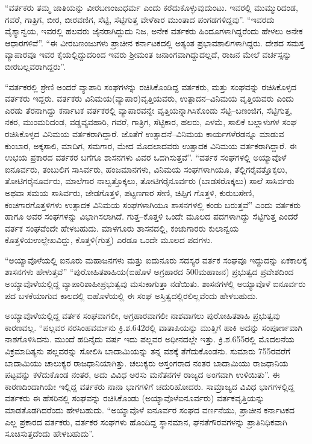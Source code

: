 “ವರ್ತಕರು ತಮ್ಮ ಜಾತಿಯನ್ನು ವೀರಬಣಂಜುಧರ್ಮ ಎಂದು ಕರೆದುಕೊಳ್ಳುವುದುಂಟು. ಇವರಲ್ಲಿ ಮುಮ್ಮುರಿದಂಡ, ಗವರೆ, ಗಾತ್ರಿಗ, ಬೀರ, ಬೀರವಣಿಗ, ಸೆಟ್ಟಿ, ಸೆಟ್ಟಿಗುತ್ತ ವೇಳೆಕಾರ ಮುಂತಾದ ಪಂಗಡಗಳಿದ್ದವು”. “ಇವರದು ವೈಶ್ಯಾನ್ವಯ, ಇವರಲ್ಲಿ ಹಲವರು ಜೈನರಾಗಿದ್ದುದು ನಿಜ, ಅನೇಕ ವರ್ತಕರು ಹಿಂದೂಗಳಾಗಿದ್ದರೆಂದು ಹೇಳಲು ಅನೇಕ ಆಧಾರಗಳಿವೆ”. “ಈ ವೀರಬಣಂಜುಗಳು ಪ್ರಾಚೀನ ಕರ್ನಾಟಕದಲ್ಲಿ ಅತ್ಯಂತ ಪ್ರಭಾವಶಾಲಿಗಳಾಗಿದ್ದರು. ದೇಶದ ಸಮಸ್ತ ವ್ಯಾಪಾರವೂ ಇವರ ಕೈಯಲ್ಲಿದ್ದುದರಿಂದ ಇವರು ಶ‍್ರೀಮಂತ ಜನಾಂಗವಾಗಿದ್ದುದಲ್ಲದೆ, ರಾಜನ ಮೇಲೆ ವರ್ಚಸ್ಸನ್ನು ಬೀರಬಲ್ಲವರಾಗಿದ್ದರು”.

“ವರ್ತಕರಲ್ಲಿ ಶ್ರೇಣಿ ಅಂದರೆ ವ್ಯಾಪಾರಿ ಸಂಘಗಳನ್ನು ರಚಿಸಿಕೊಂಡಿದ್ದ ವರ್ತಕರು, ಮತ್ತು ಸಂಘವನ್ನು ರಚಿಸಿಕೊಳ್ಳದ ವರ್ತಕರು ಇದ್ದರು. ವರ್ತಕರು ವಿನಿಮಯ(ವ್ಯಾಪಾರ)ವೃತ್ತಿಯವರು, ಉತ್ಪಾದನ–ವಿನಿಮಯ ವೃತ್ತಿಯವರು ಎಂದು ಎರಡು ತೆರನಾಗಿದ್ದು ಕರ್ನಾಟಕ ವರ್ತಕರಲ್ಲಿ ವ್ಯಾಪಾರವನ್ನೇ ವೃತ್ತಿಯನ್ನಾಗಿಸಿಕೊಂಡು ಸೆಟ್ಟಿ–ಬಣಂಜಿಗ, ಸೆಟ್ಟಿಗುತ್ತ, ನಕರ, ಮುಂಮರಿದಂಡ, ವಡ್ಡವ್ಯವಹಾರಿ, ಗವರೆ, ಗಾತ್ರಿಗ, ಸೆಟ್ಟಿಕಾರ, ಹಲರು, ಎಳಮೆ, ಸಾಲಿಕೆ ಬಲ್ಲಾಳುಗಳ ಸಂಘ ರಚಿಸಿಕೊಳ್ಳದ ವಿನಿಮಯ ವರ್ತಕರಾಗಿದ್ದಾರೆ. ಜೊತೆಗೆ ಉತ್ಪಾದನೆ–ವಿನಿಮಯ ಕಾರ್ಯಗಳೆರಡನ್ನೂ ಮಾಡುವ ಕುಂಬಾರ, ಅಕ್ಕಸಾಲಿ, ಮಾದಿಗ, ಸಮಗಾರ, ಮೇದ ಮೊದಲಾದವರು ಉತ್ಪಾದಕ ವಿನಿಮಯ ವರ್ತಕರಾಗಿದ್ದಾರೆ. ಈ ಉಭಯ ಪ್ರಕಾರದ ವರ್ತಕರ ಬಗೆಗೂ ಶಾಸನಗಳು ವಿವರ ಒದಗಿಸುತ್ತವೆ”. “ವರ್ತಕ ಸಂಘಗಳಲ್ಲಿ ಅಯ್ಯಾವೊಳೆ ಐನೂರ್ವರು, ತಂಬುಲಿಗ ಸಾಸಿರ್ವರು, ಹಂಜಮಾನಗಳು, ವಿನಿಮಯ ಸಂಘಗಳಾಗಿಯೂ, ತೆಲ್ಲಿಗರೈವತ್ತೊಕ್ಕಲು, ತೋಟಿಗರೈನೂರ್ವರು, ಮಾಲೆಗಾರ ನಾಲ್ವತ್ತೊಕ್ಕಲು, ತೋಟಿಗರೈನೂರ್ವರು (ಬಾಡಸರೊಕ್ಕಲು) ಸಾಲೆ ಸಾಸಿರ್ವರು ಅಥವಾ ಸಮಯ ಸಾಸಿರ್ವರು, ಜೇಡಗೊತ್ತಳಿ, ಪಟ್ಟಣಗಾರ ಸೇಣಿ, ಚಿಪ್ಪಿಗ ಗೊತ್ತಳಿ, ಕುರುಬಸೇಣಿ, ಕಂಚಗಾರಗೊತ್ತಳಿಗಳು ಉತ್ಪಾದಕ ವಿನಿಮಯ ಸಂಘಗಳಾಗಿಯೂ ಶಾಸನಗಳಲ್ಲಿ ಕಂಡು ಬರುತ್ತವೆ” ಎಂದು ವರ್ತಕರು ಹಾಗೂ ಅವರ ಸಂಘಗಳನ್ನು ವಿಭಾಗಿಸಲಾಗಿದೆ. ಗುತ್ತ–ಕೊತ್ತಳಿ ಒಂದೇ ಮೂಲದ ಪದಗಳಾಗಿದ್ದು ಸೆಟ್ಟಿಗುತ್ತ ಎಂದರೆ ವರ್ತಕ ಸಂಘವೆಂದೇ ಹೇಳಬಹುದು. ಮಾಳಗೂರು ಶಾಸನದಲ್ಲಿ, ಕಂಚುಗಾರರು ಕುಲಾನ್ವಯ ಕೊತ್ತಳಿಯಉಲ್ಲೇಖವಿದ್ದು, ಕೊತ್ತಳಿ(ಗುತ್ತ) ಎರಡೂ ಒಂದೇ ಮೂಲದ ಪದಗಳು.

“ಅಯ್ಯಾವೊಳೆಯಲ್ಲಿ ಐನೂರು ಮಹಾಜನಗಳು ಮತ್ತು ಐದುನೂರು ಸದಸ್ಯರ ವರ್ತಕ ಸಂಘವೂ ಇದ್ದುದನ್ನು ಏಕಕಾಲಕ್ಕೆ ಶಾಸನಗಳು ಹೇಳುತ್ತವೆ” “ಪುರೋಹಿತಶಾಹಿಯ(ಐಹೊಳೆ ಅಗ್ರಹಾರದ 500ಮಹಾಜನ) ಪ್ರಭುತ್ವದ ಪ್ರವೇಶದಿಂದ ಅಯ್ಯಾವೊಳೆಯಲ್ಲಿದ್ದ ವ್ಯಾಪಾರಿಶಾಹೀಪ್ರಭುತ್ವವು ಮಸುಕಾಗುತ್ತಾ ನಡೆಯಿತು. ಶಾಸನಗಳಲ್ಲಿ ಅಯ್ಯಾವೊಳೆ ಐನೂರ್ವರು ಪದ ಬಳಕೆಯಾಗುವ ಕಾಲದಲ್ಲಿ ಐಹೊಳೆಯಲ್ಲಿ ಈ ಸಂಘ ಅಸ್ತಿತ್ವದಲ್ಲಿರಲಿಲ್ಲವೆಂದು ಹೇಳಬಹುದು.

ಅಯ್ಯಾವೊಳೆಯಲ್ಲಿದ್ದ ವರ್ತಕ ಸಂಘವಾಗಲೀ, ಅಗ್ರಹಾರವಾಗಲೀ ನಾಶವಾಗಲು ಪುರೋಹಿತಶಾಹಿ ಪ್ರಭುತ್ವವು ಕಾರಣವಲ್ಲ. “ಪಲ್ಲವರ ನರಸಿಂಹವರ್ಮನು ಕ್ರಿ.ಶ.642ರಲ್ಲಿ ವಾತಾಪಿಯನ್ನು ಮುತ್ತಿಗೆ ಹಾಕಿ ಅದನ್ನು ಸಂಪೂರ್ಣವಾಗಿ ನಾಶಗೊಳಿಸಿದನು. ಮುಂದೆ ಹದಿನೈದು ವರ್ಷ ಇದು ಪಲ್ಲವರ ಅಧೀನದಲ್ಲೇ ಇತ್ತು. ಕ್ರಿ.ಶ.655ರಲ್ಲಿ ಮೊದಲನೆಯ ವಿಕ್ರಮಾದಿತ್ಯನು ಪಲ್ಲವರನ್ನು ಸೋಲಿಸಿ ಬಾದಾಮಿಯನ್ನು ತನ್ನ ವಶಕ್ಕೆ ತೆಗೆದುಕೊಂಡನು. ಸುಮಾರು 755ರವರೆಗೆ ಬಾದಾಮಿಯು ಚಾಲುಕ್ಯರ ರಾಜಧಾನಿಯಾಗಿತ್ತು. ಚಲುಕ್ಯರು ಅಸ್ತಂಗರಾದ ನಂತರ ಬಾದಾಮಿಯು ರಾಜಧಾನಿಯ ಪಟ್ಟವನ್ನು ಕಳೆದುಕೊಂಡ ನಂತರ, ಅದು ವಿವಿಧ ಅರಸು ಮನೆತನಗಳ ರಾಜ್ಯದ ಅಂಗವಾಗಿ ಉಳಿಯಿತು”. ಈ ಕಾರಣದಿಂದಾಗಿಯೇ ಇಲ್ಲಿದ್ದ ವರ್ತಕರು ನಾನಾ ಭಾಗಗಳಿಗೆ ಚದುರಿಹೋದರು. ಸಾಮ್ರಾಜ್ಯದ ವಿವಿಧ ಭಾಗಗಳಲ್ಲಿದ್ದ ವರ್ತಕರು ಈ ಹೆಸರಿನಲ್ಲಿ ಸಂಘವನ್ನು ರಚಿಸಿಕೊಂಡು (ಅಯ್ಯಾವೊಳೆಐನೂರ್ವರು) ವರ್ತಕವೃತ್ತಿಯನ್ನು ಮಾಡತೊಡಗಿದರೆಂದು ಹೇಳಬಹುದು. “ಅಯ್ಯಾವೊಳೆ ಐನೂರ್ವರ ಸಂಘದ ವರ್ಣನೆಯು, ಪ್ರಾಚೀನ ಕರ್ನಾಟಕದ ಎಲ್ಲ ಪ್ರಕಾರದ ವರ್ತಕರು, ವರ್ತಕರ ಸಂಘಗಳು ಹೊಂದಿದ್ದ ಸ್ಥಾನಮಾನ, ಘನತೆಗೌರವಗಳನ್ನು ಪ್ರಾತಿನಿಧಿಕವಾಗಿ ಸೂಚಿಸುತ್ತದೆಂದು ಹೇಳಬಹುದು”.

